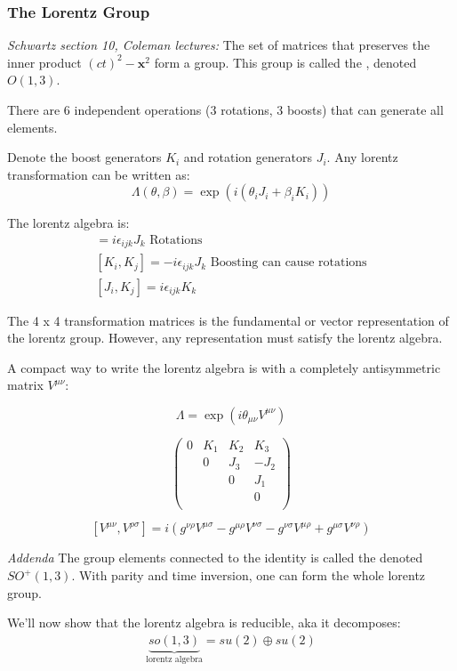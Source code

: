 \documentclass[11pt]{scrartcl}
\begin{document}
\subsubsection{The Lorentz Group}
\emph{Schwartz section 10, Coleman lectures: }
The set of matrices that preserves the inner product
$(ct)^2 - \mathbf{x}^2$ form a group. This group is called the , denoted $O(1, 3)$.

There are 6 independent operations (3 rotations, 3 boosts) that can generate all elements.

Denote the boost generators $K_i$ and rotation generators $J_i$.
Any lorentz transformation can be written as:
\[ \Lambda(\theta, \beta) = \exp\left(i (\theta_i J_i + \beta_i K_i) \right) \]

The lorentz algebra is:
\begin{align}
	[J_i, J_j] = i \epsilon_{ijk} J_k \text{  Rotations}\\
	[K_i, K_j] = - i \epsilon_{ijk} J_k \text{  Boosting can cause rotations}  \\
	[J_i, K_j] = i \epsilon_{ijk} K_k 
\end{align}

The 4 x 4 transformation matrices is the fundamental or vector representation of the lorentz group. However, any representation must satisfy the lorentz algebra.

A compact way to write the lorentz algebra is with a completely antisymmetric matrix $V^{\mu \nu}$:

\[ \Lambda = \exp \left(i \theta_{\mu \nu} V^{\mu \nu} \right)\]

\[ \left( \begin{array}{cccc}
	0 & K_1 & K_2 & K_3 \\
	& 0 & J_3 &  -J_2\\
	&  & 0 & J_1  \\
	&  &    & 0 \\
\end{array} \right)
\]

\[ [V^{\mu \nu}, V^{\rho \sigma}] = i \left(g^{\nu \rho}V^{\mu \sigma} - g^{\mu \rho} V^{\nu \sigma} - g^{\nu \sigma} V^{\mu \rho} + g^{\mu \sigma} V^{\nu \rho} \right)\]

\emph{Addenda}
The group elements connected to the identity is called the  denoted $SO^+(1, 3)$.  With parity and time inversion, one can form the whole lorentz group.

We'll now show that the lorentz algebra is reducible, aka it decomposes:
\begin{align}
	\underbrace{so(1, 3)}_{\text{lorentz algebra}} = su(2) \oplus su(2)
\end{align}
\end{document}
